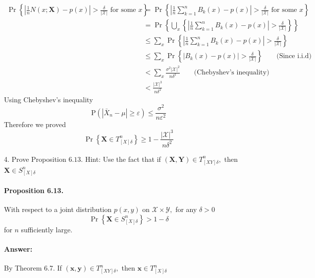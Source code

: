 \documentclass[8pt]{article}
\begin{document}
$$
\begin{aligned}
	\operatorname{Pr}\left\{\left|\frac{1}{n} N(x ; \mathbf{X})-p(x)\right|>\frac{\delta}{|\mathcal{X}|} \text { for some } x\right\} 
	&=\operatorname{Pr}\left\{\left|\frac{1}{n} \sum_{k=1}^{n} B_{k}(x)-p(x)\right|>\frac{\delta}{|\mathcal{X}|} \text { for some } x\right\} \\
	&=\operatorname{Pr}\left\{\bigcup_{x}\left\{\left|\frac{1}{n} \sum_{k=1}^{n} B_{k}(x)-p(x)\right|>\frac{\delta}{|\mathcal{X}|}\right\}\right\} \\
	&\leq \sum_{x} \operatorname{Pr}\left\{\left|\frac{1}{n} \sum_{k=1}^{n} B_{k}(x)-p(x)\right|>\frac{\delta}{|\mathcal{X}|}\right\} \\
	&\leq \sum_{x} \operatorname{Pr}\left\{\left| B_{k}(x)-p(x)\right|>\frac{\delta}{|\mathcal{X}|}\right\} \qquad \text{(Since i.i.d)}\\
	&<\sum_{x} \frac{\sigma^{2}   |\mathcal{X}|^2 }{n \delta^{2}}  \qquad \text{(Chebyshev's inequality)}\\
	&< \frac{|\mathcal{X}|^{3}}{n \delta^{2}}
\end{aligned}
$$
Using Chebyshev's inequality
$$
\mathrm{P}\left(\left|\bar{X}_{n}-\mu\right| \geq \varepsilon\right) \leq \frac{\sigma^{2}}{n \varepsilon^{2}}
$$
Therefore we proved
$$
\operatorname{Pr}\left\{\mathbf{X} \in T_{[X] \delta}^{n}\right\} \geq 1-\frac{|\mathcal{X}|^{3}}{n \delta^{2}}
$$
\begin{tcolorbox}
4. Prove Proposition $6.13 .$ Hint: Use the fact that if $(\mathbf{X}, \mathbf{Y}) \in T_{[X Y] \delta}^{n},$ then $\mathbf{X} \in S_{[X] \delta}^{n}$
\end{tcolorbox}

\paragraph{Proposition 6.13.} With respect to a joint distribution $p(x, y)$ on $\mathcal{X} \times \mathcal{Y},$ for any $\delta>0$
$$
\operatorname{Pr}\left\{\mathbf{X} \in S_{[X] \delta}^{n}\right\}>1-\delta
$$
for $n$ sufficiently large.
\paragraph{Answer:}
By Theorem 6.7. If $(\mathbf{x}, \mathbf{y}) \in T_{[X Y] \delta}^{n},$ then $\mathbf{x} \in T_{[X] \delta}^{n}$
\end{document}
